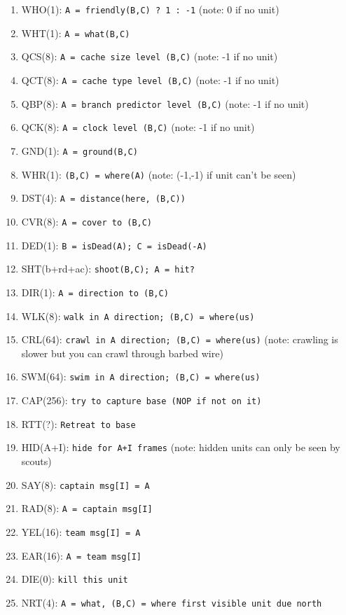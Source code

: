 \documentclass{article}
\begin{document}
\begin{enumerate}[noitemsep]
    \item WHO(1): \texttt{A = friendly(B,C) ? 1 : -1} (note: 0 if no unit)
    \item WHT(1): \texttt{A = what(B,C)}
    \item QCS(8): \texttt{A = cache size level (B,C)} (note: -1 if no unit)
    \item QCT(8): \texttt{A = cache type level (B,C)} (note: -1 if no unit)
    \item QBP(8): \texttt{A = branch predictor level (B,C)} (note: -1 if no unit)
    \item QCK(8): \texttt{A = clock level (B,C)} (note: -1 if no unit)
    \item GND(1): \texttt{A = ground(B,C)}
    \item WHR(1): \texttt{(B,C) = where(A)} (note: (-1,-1) if unit can't be seen)
    \item DST(4): \texttt{A = distance(here, (B,C))}
    \item CVR(8): \texttt{A = cover to (B,C)}
    \item DED(1): \texttt{B = isDead(A); C = isDead(-A)}
    \item SHT(b+rd+ac): \texttt{shoot(B,C); A = hit?}
    \item DIR(1): \texttt{A = direction to (B,C)}
    \item WLK(8): \texttt{walk in A direction; (B,C) = where(us)}
    \item CRL(64): \texttt{crawl in A direction; (B,C) = where(us)} (note:
        crawling is slower but you can crawl through barbed wire)
    \item SWM(64): \texttt{swim in A direction; (B,C) = where(us)}
    \item CAP(256): \texttt{try to capture base (NOP if not on it)}
    \item RTT(?): \texttt{Retreat to base}
    \item HID(A+I): \texttt{hide for A+I frames} (note: hidden units can only be
        seen by scouts)
    \item SAY(8): \texttt{captain msg[I] = A}
    \item RAD(8): \texttt{A = captain msg[I]}
    \item YEL(16): \texttt{team msg[I] = A}
    \item EAR(16): \texttt{A = team msg[I]}
    \item DIE(0): \texttt{kill this unit}
    \item NRT(4): \texttt{A = what, (B,C) = where first visible unit due north}

\end{enumerate}
\end{document}
